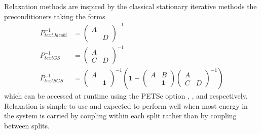 Relaxation methods are inspired by the classical stationary iterative methods the preconditioners taking the forms
\begin{align*}
  P^{-1}_{text{Jacobi}} &= \begin{pmatrix} A & \\ & D \end{pmatrix}^{-1} \\
  P^{-1}_{text{GS}} &= \begin{pmatrix} A & \\ C & D \end{pmatrix}^{-1} \\
  P^{-1}_{text{SGS}} &=
      \begin{pmatrix} A & \\  & \bm 1 \end{pmatrix}^{-1}
      \left(
        \bm 1 -
        \begin{pmatrix} A & B \\ & \bm 1 \end{pmatrix}
        \begin{pmatrix} A & \\ C & D \end{pmatrix}^{-1}
      \right)
\end{align*}
which can be accessed at runtime using the PETSc option , , and  respectively.
Relaxation is simple to use and expected to perform well when most energy in the system is carried by coupling within each split rather than by coupling between splits.

